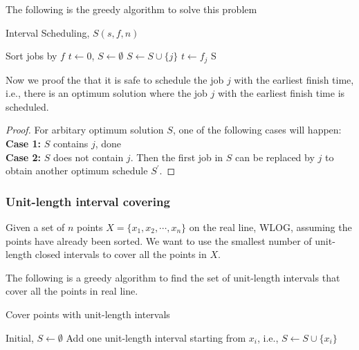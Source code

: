 					The following is the greedy algorithm to solve this problem
					\begin{algorithm}[!ht]
						\caption{Interval Scheduling, $S(s, f, n)$}
						\begin{algorithmic}[1]
							\State Sort jobs by $f$
							\State $t \gets 0$, $S\gets \emptyset$
									\State $S \gets S \cup \{j\}$
									\State $t \gets f_j$
								\EndIf
							\EndFor
							\Return S
						\end{algorithmic}
					\end{algorithm}

					Now we proof the that it is safe to schedule the job $j$ with the earliest finish time, i.e., there is an optimum solution where the job $j$ with the earliest finish time is scheduled.

					\begin{proof}
						For arbitary optimum solution $S$, one of the following cases will happen:\\
						\textbf{Case 1: } $S$ contains $j$, done\\
						\textbf{Case 2: } $S$ does not contain $j$. Then the first job in $S$ can be replaced by $j$ to obtain another optimum schedule $S^\prime$.
					\end{proof}

				\subsubsection{Unit-length interval covering}
					Given a set of $n$ points $X = \{x_1, x_2, \cdots, x_n\}$ on the real line, WLOG, assuming the points have already been sorted. We want to use the smallest number of unit-length closed intervals to cover all the points in $X$. 

					The following is a greedy algorithm to find the set of unit-length intervals that cover all the points in real line.
					\begin{algorithm}[!ht]
						\caption{Cover points with unit-length intervals}
						\begin{algorithmic}[1]
							\State Initial, $S \gets \emptyset$
									\State Add one unit-length interval starting from $x_i$, i.e., $S \gets S \cup \{x_i\}$
								\EndIf
							\EndFor
						\end{algorithmic}
					\end{algorithm}

